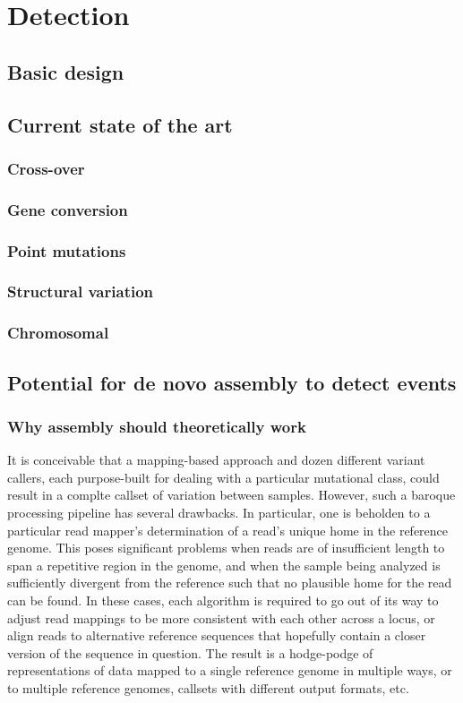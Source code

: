 \chapter{Detection}
\label{ch:detection}

\section{Basic design}

\section{Current state of the art}
\subsection{Cross-over}
\subsection{Gene conversion}
\subsection{Point mutations}
\subsection{Structural variation}
\subsection{Chromosomal}

\section{Potential for de novo assembly to detect events}

\subsection{Why assembly should theoretically work}

It is conceivable that a mapping-based approach and dozen different variant callers, each purpose-built for dealing with a particular mutational class, could result in a complte callset of variation between samples.  However, such a baroque processing pipeline has several drawbacks.  In particular, one is beholden to a particular read mapper's determination of a read's unique home in the reference genome.  This poses significant problems when reads are of insufficient length to span a repetitive region in the genome, and when the sample being analyzed is sufficiently divergent from the reference such that no plausible home for the read can be found.  In these cases, each algorithm is required to go out of its way to adjust read mappings to be more consistent with each other across a locus, or align reads to alternative reference sequences that hopefully contain a closer version of the sequence in question.  The result is a hodge-podge of representations of data mapped to a single reference genome in multiple ways, or to multiple reference genomes, callsets with different output formats, etc.

